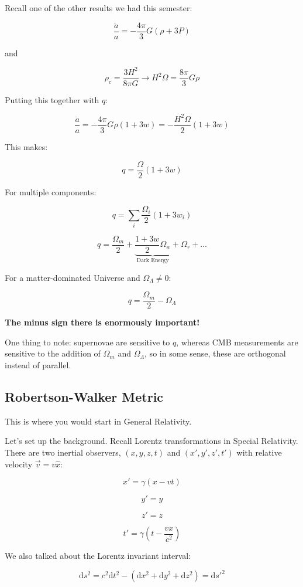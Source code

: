 \documentclass{article}
\newcommand{\be}{\begin{equation}}
\newcommand{\ee}{\end{equation}}
\begin{document}
Recall one of the other results we had this semester:

\be
\frac{\ddot{a}}{a} = -\frac{4\pi}{3}G\left(\rho+3P\right)
\ee

and

\be
\rho_c = \frac{3H^2}{8\pi G} \rightarrow H^2 \Omega = \frac{8\pi}{3}G\rho
\ee

Putting this together with $q$:

\be
\frac{\ddot{a}}{a} = -\frac{4\pi}{3}G\rho \left(1+3w\right) = -\frac{H^2 \Omega}{2}\left(1+3w\right)
\ee

This makes:

\be
q = \frac{\Omega}{2}\left(1+3w\right)
\ee

For multiple components:

\be
\boxed{q = \sum_i \frac{\Omega_i}{2}\left(1+3w_i\right)}
\ee

\be
q = \frac{\Omega_m}{2} + \underbrace{\frac{1+3w}{2}\Omega_w}_\text{Dark Energy} + \Omega_r + ...
\ee

For a matter-dominated Universe and $\Omega_\Lambda \neq 0$:

\be
\boxed{q = \frac{\Omega_m}{2} - \Omega_\Lambda}
\ee

\textbf{The minus sign there is enormously important!}

One thing to note: supernovae are sensitive to $q$, whereas CMB measurements are sensitive to the addition of $\Omega_m$ and $\Omega_\Lambda$, so in some sense, these are orthogonal instead of parallel. 

\subsection{Robertson-Walker Metric}

This is where you would start in General Relativity. 

Let's set up the background. Recall Lorentz transformations in Special Relativity. There are two inertial observers, $(x,y,z,t)$ and $(x',y',z',t')$ with relative velocity $\vec{v}=v\hat{x}$:

\be
x' = \gamma(x-vt)
\ee

\be
y' = y
\ee

\be
z' = z
\ee

\be
t' = \gamma\left(t-\frac{vx}{c^2}\right)
\ee

We also talked about the Lorentz invariant interval:

\be
\mathrm{d}s^2 = c^2 \mathrm{d}t^2 - \left(\mathrm{d}x^2 + \mathrm{d}y^2 + \mathrm{d}z^2\right) = \mathrm{d}s'^2
\ee
\end{document}
